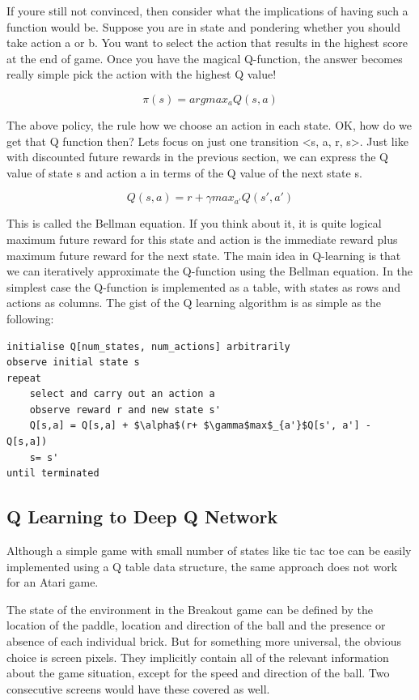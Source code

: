 \documentclass[a4paper,11pt]{report}
\begin{document}
				If youre still not convinced, then consider what the implications of having such a function would be. Suppose you are in state and pondering whether you should take action a or b. You want to select the action that results in the highest score at the end of game. Once you have the magical Q-function, the answer becomes really simple pick the action with the highest Q value!

				\[ \pi(s) = argmax_a Q(s,a) \]

				The above policy, the rule how we choose an action in each state.
				OK, how do we get that Q function then? Lets focus on just one transition <s, a, r, s>. Just like with discounted future rewards in the previous section, we can express the Q value of state s and action a in terms of the Q value of the next state s.

				\[ Q(s,a) = r + {\gamma}max_{a'}Q(s',a')\]

				This is called the Bellman equation. If you think about it, it is quite logical maximum future reward for this state and action is the immediate reward plus maximum future reward for the next state.
				The main idea in Q-learning is that we can iteratively approximate the Q-function using the Bellman equation. In the simplest case the Q-function is implemented as a table, with states as rows and actions as columns. The gist of the Q learning algorithm is as simple as the following:

				\begin{lstlisting}[mathescape=true, morekeywords={repeat, until}]
initialise Q[num_states, num_actions] arbitrarily
observe initial state s
repeat
	select and carry out an action a
	observe reward r and new state s'
	Q[s,a] = Q[s,a] + $\alpha$(r+ $\gamma$max$_{a'}$Q[s', a'] - Q[s,a])
	s= s'
until terminated
				\end{lstlisting}

			\subsection{Q Learning to Deep Q Network}
				Although a simple game with small number of states like tic tac toe can be easily implemented using a Q table data structure, the same approach does not work for an Atari game.

				The state of the environment in the Breakout game can be defined by the location of the paddle, location and direction of the ball and the presence or absence of each individual brick. But for something more universal, the obvious choice is screen pixels. They implicitly contain all of the relevant information about the game situation, except for the speed and direction of the ball. Two consecutive screens would have these covered as well.\\
\end{document}
